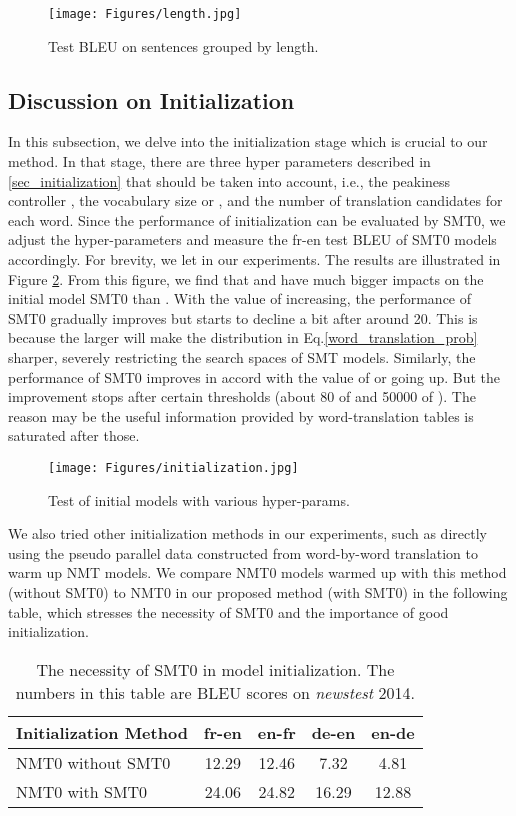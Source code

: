 \documentclass[letterpaper]{article} \usepackage{aaai19}  \usepackage{times}  \usepackage{helvet}  \usepackage{courier}  \usepackage{url}  \usepackage{graphicx}  \usepackage{amsmath}
\newcommand{\newref}[1]{Eq.\eqref{#1}}
\begin{document}
\begin{figure}[!htb]
\centering
\texttt{[image: Figures/length.jpg]}
\caption{Test BLEU on sentences grouped by length.}
\label{fig:evolution}
\end{figure}

\subsection{Discussion on Initialization}
In this subsection, we delve into the initialization stage which is crucial to our method.
In that stage, there are three hyper parameters described in \ref{sec_initialization} that should be taken into account, i.e., the peakiness controller , the vocabulary size  or , and the number of translation candidates  for each word. Since the performance of initialization can be evaluated by SMT0, we adjust the hyper-parameters and measure the fr-en test BLEU of SMT0 models accordingly. For brevity, we let  in our experiments. The results are illustrated in Figure \ref{fig:init}. From this figure, we find that  and  have much bigger impacts on the initial model SMT0 than . With the value of  increasing, the performance of SMT0 gradually improves but starts to decline a bit after around 20. This is because the larger  will make the distribution in \newref{word_translation_prob} sharper, severely restricting the search spaces of SMT models. Similarly, the performance of SMT0 improves in accord with the value of  or  going up. But the improvement stops after certain thresholds (about 80 of  and 50000 of ). The reason may be the useful information provided by word-translation tables is saturated after those.  

\begin{figure}[t]
\centering
\texttt{[image: Figures/initialization.jpg]}
\caption{Test of initial models with various hyper-params.}
\label{fig:init}
\end{figure}

We also tried other initialization methods in our experiments, such as directly using the pseudo parallel data constructed from word-by-word translation to warm up NMT models. We compare NMT0 models warmed up with this method (without SMT0) to NMT0 in our proposed method (with SMT0) in the following table, which stresses the necessity of SMT0 and the importance of good initialization.

\begin{table}[hp]
\small
\begin{center}
\begin{tabular}{l|cccc}
\hline
Initialization Method & fr-en & en-fr & de-en & en-de \\
\hline
\hline
NMT0 without SMT0 & 12.29 & 12.46 & 7.32 & 4.81\\
NMT0 with SMT0 & 24.06 & 24.82 & 16.29 & 12.88\\
\hline
\end{tabular}
\end{center}
\caption{\label{tab:init}The necessity of SMT0 in model initialization. The numbers in this table are BLEU scores on \emph{newstest} 2014.}
\end{table}
\end{document}
